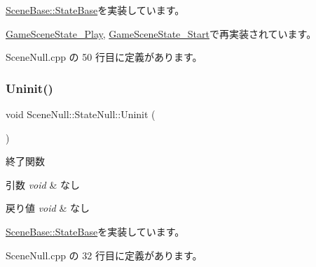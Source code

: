 \mbox{\hyperlink{class_scene_base_1_1_state_base_aba22c2bc7244d4ffcd6f159c28be2dcf}{Scene\+Base\+::\+State\+Base}}を実装しています。



\mbox{\hyperlink{class_game_scene_state___play_ae564bcc1a570009c144722f252cb73ff}{Game\+Scene\+State\+\_\+\+Play}}, \mbox{\hyperlink{class_game_scene_state___start_a667dd2400867b901ca8f2ce3a4f7d367}{Game\+Scene\+State\+\_\+\+Start}}で再実装されています。



 Scene\+Null.\+cpp の 50 行目に定義があります。

\mbox{\label{class_scene_null_1_1_state_null_ae6b633f3f092834cea11f489bf41e548}} 
\subsubsection{\texorpdfstring{Uninit()}{Uninit()}}
{\footnotesize\ttfamily void Scene\+Null\+::\+State\+Null\+::\+Uninit (\begin{DoxyParamCaption}{ }\end{DoxyParamCaption})\hspace{0.3cm}{\ttfamily [virtual]}}



終了関数 


\begin{DoxyParams}{引数}
{\em void} & なし \\
\hline
\end{DoxyParams}

\begin{DoxyRetVals}{戻り値}
{\em void} & なし \\
\hline
\end{DoxyRetVals}


\mbox{\hyperlink{class_scene_base_1_1_state_base_a2763fa37e45b39bd8d3bbb735c76c59b}{Scene\+Base\+::\+State\+Base}}を実装しています。



 Scene\+Null.\+cpp の 32 行目に定義があります。

\mbox{\label{class_scene_null_1_1_state_null_a835f82c22afb290eca79460450088baf}} 
